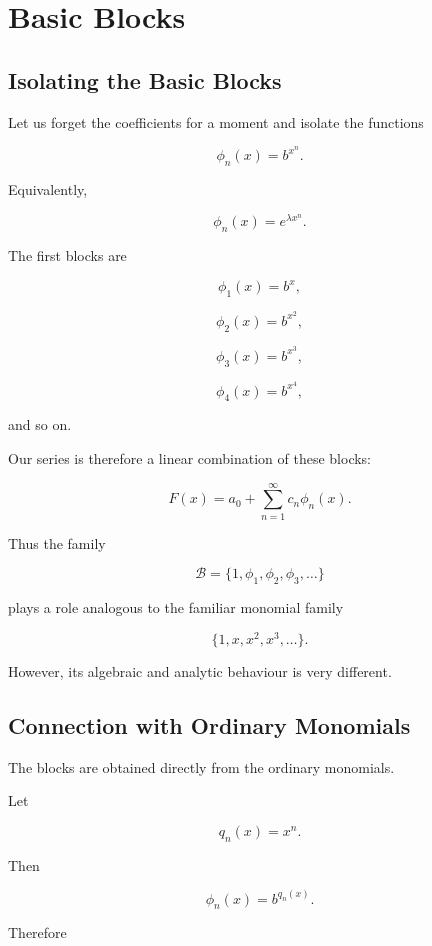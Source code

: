 
\chapter{Basic Blocks}

\section{Isolating the Basic Blocks}

Let us forget the coefficients for a moment and isolate the functions

\[
\boxed{
\phi_n(x)=b^{x^n}.
}
\]

Equivalently,

\[
\phi_n(x)=e^{\lambda x^n}.
\]

The first blocks are

\[
\phi_1(x)=b^x,
\]

\[
\phi_2(x)=b^{x^2},
\]

\[
\phi_3(x)=b^{x^3},
\]

\[
\phi_4(x)=b^{x^4},
\]

and so on.

Our series is therefore a linear combination of these blocks:

\[
\boxed{
F(x)=a_0+\sum_{n=1}^{\infty}c_n\phi_n(x).
}
\]

Thus the family

\[
\mathcal{B}
=
\{
1,\phi_1,\phi_2,\phi_3,\ldots
\}
\]

plays a role analogous to the familiar monomial family

\[
\{
1,x,x^2,x^3,\ldots
\}.
\]

However, its algebraic and analytic behaviour is very different.

\section{Connection with Ordinary Monomials}

The blocks are obtained directly from the ordinary monomials.

Let

\[
q_n(x)=x^n.
\]

Then

\[
\phi_n(x)=b^{q_n(x)}.
\]

Therefore

